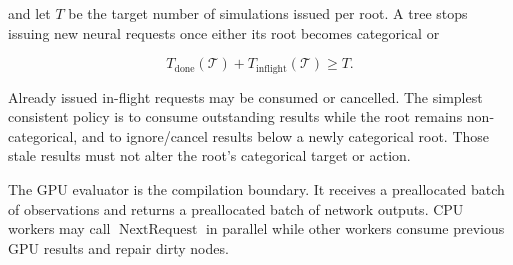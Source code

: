 \documentclass[11pt]{article}
\newcommand{\Tree}{\mathcal{T}}
\newcommand{\NextRequest}{\operatorname{NextRequest}}
\begin{document}
and let \(T\) be the target number of simulations issued per root. A tree stops
issuing new neural requests once either its root becomes categorical or

\[
T_{\mathrm{done}}(\Tree)+T_{\mathrm{inflight}}(\Tree)\ge T.
\]

Already issued in-flight requests may be consumed or cancelled. The simplest
consistent policy is to consume outstanding results while the root remains
non-categorical, and to ignore/cancel results below a newly categorical root.
Those stale results must not alter the root's categorical target or action.

The GPU evaluator is the compilation boundary. It receives a preallocated batch
of observations and returns a preallocated batch of network outputs. CPU workers
may call \(\NextRequest\) in parallel while other workers consume previous GPU
results and repair dirty nodes.
\end{document}

